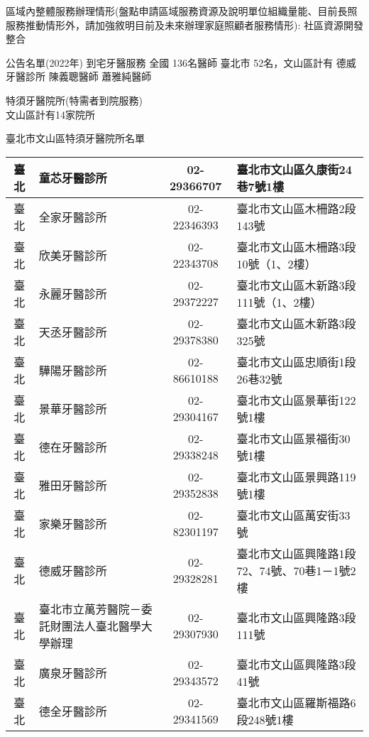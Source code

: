 區域內整體服務辦理情形(盤點申請區域服務資源及說明單位組織量能、目前長照服務推動情形外，請加強敘明目前及未來辦理家庭照顧者服務情形):
社區資源開發整合
\begin{outline}
\0 公告名單(2022年)
\1 到宅牙醫服務
\2 全國 136名醫師
\2 臺北市 52名，文山區計有
德威牙醫診所 陳義聰醫師 蕭雅純醫師

\1 特須牙醫院所(特需者到院服務)\\
\2 文山區計有14家院所
\end{outline}

臺北市文山區特須牙醫院所名單\\
\begin{tabularx}{1.0625\textwidth}{|c|p{3.2cm}|c|l|}
\hline
臺北&	童芯牙醫診所&	02-29366707 &	臺北市文山區久康街24巷7號1樓\\
\hline
臺北&	全家牙醫診所&	02-22346393 &	臺北市文山區木柵路2段143號\\
\hline
臺北 &	欣美牙醫診所 &	02-22343708 &	臺北市文山區木柵路3段10號（1、2樓）\\
\hline
臺北 &	永麗牙醫診所 &	02-29372227 &	臺北市文山區木新路3段111號（1、2樓）\\
\hline
臺北 &	天丞牙醫診所 &	02-29378380 &	臺北市文山區木新路3段325號\\
\hline
臺北 &	驊陽牙醫診所 &	02-86610188 &	臺北市文山區忠順街1段26巷32號\\
\hline
臺北 &	景華牙醫診所 &	02-29304167 &	臺北市文山區景華街122號1樓\\
\hline
臺北 &	德在牙醫診所 &	02-29338248 &	臺北市文山區景福街30號1樓\\
\hline
臺北 &	雅田牙醫診所 &	02-29352838 &	臺北市文山區景興路119號1樓\\
\hline
臺北 &	家樂牙醫診所 &	02-82301197 &	臺北市文山區萬安街33號\\
\hline
臺北 &	德威牙醫診所 &	02-29328281 &	臺北市文山區興隆路1段72、74號、70巷1－1號2樓\\
\hline
臺北 &	臺北市立萬芳醫院－委託財團法人臺北醫學大學辦理
&	02-29307930 &	臺北市文山區興隆路3段111號\\
\hline
臺北 &	廣泉牙醫診所 &	02-29343572 &	臺北市文山區興隆路3段41號\\
\hline
臺北 &	德全牙醫診所 &	02-29341569 &	臺北市文山區羅斯福路6段248號1樓\\
\hline
\end{tabularx}

